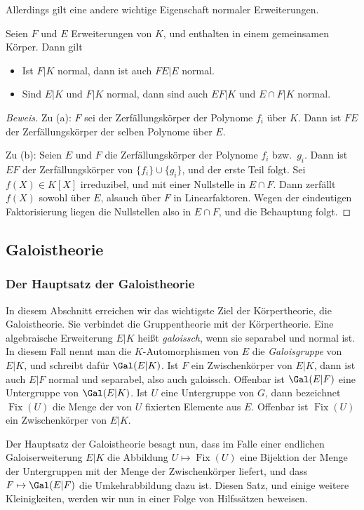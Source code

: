 \documentclass[12pt,a4paper,twoside]{article}
\newcommand{\ei}[1]{\emph{#1}\index{#1}}
\DeclareMathOperator{\Fix}{Fix}
\begin{document}
Allerdings gilt eine andere wichtige Eigenschaft normaler Erweiterungen.
\begin{Satz}
  Seien $F$ und $E$ Erweiterungen von $K$, und enthalten in einem gemeinsamen
  K\"orper. Dann gilt
  \begin{itemize}
  \item[(a)] Ist $F|K$ normal, dann ist auch $FE|E$ normal.
\item[(b)] Sind $E|K$ und $F|K$ normal, dann sind auch $EF|K$ und $E\cap F|K$
  normal.
  \end{itemize}
\end{Satz}
\begin{proof}[Beweis]
  Zu (a): $F$ sei der Zerf\"allungsk\"orper der Polynome $f_i$ \"uber $K$.
  Dann ist $FE$ der Zerf\"allungsk\"orper der selben Polynome \"uber $E$.

Zu (b): Seien $E$ und $F$ die Zerf\"allungsk\"orper der Polynome $f_i$ bzw.\
$g_i$. Dann ist $EF$ der Zerf\"allungsk\"orper von $\{f_i\}\cup\{g_i\}$, und
der erste Teil folgt. Sei $f(X)\in K[X]$ irreduzibel, und mit einer Nullstelle
in $E\cap F$. Dann zerf\"allt $f(X)$ sowohl \"uber $E$, alsauch \"uber $F$ in
Linearfaktoren. Wegen der eindeutigen Faktorisierung liegen die Nullstellen
also in $E\cap F$, und die Behauptung folgt.
\end{proof}
\subsection{Galoistheorie}
\subsubsection{Der Hauptsatz der Galoistheorie}
In diesem Abschnitt erreichen wir das wichtigste Ziel der K\"orpertheorie, die
Galoistheorie. Sie verbindet die Gruppentheorie mit der K\"orpertheorie. Eine
algebraische Erweiterung $E|K$ hei\ss t \ei{galoissch}, wenn sie separabel und
normal ist. In diesem Fall nennt man die $K$-Automorphismen von $E$ die
\ei{Galoisgruppe} von $E|K$, und schreibt daf\"ur $\Gal(E|K)$. Ist $F$ ein
Zwischenk\"orper von $E|K$, dann ist auch $E|F$ normal und separabel, also
auch galoissch. Offenbar ist $\Gal(E|F)$ eine Untergruppe von $\Gal(E|K)$. Ist
$U$ eine Untergruppe von $G$, dann bezeichnet $\Fix(U)$ die Menge der von $U$
fixierten Elemente aus $E$. Offenbar ist $\Fix(U)$ ein Zwischenk\"orper von
$E|K$.

Der Hauptsatz der Galoistheorie besagt nun, dass im Falle einer endlichen
Galoiserweiterung $E|K$ die Abbildung $U\mapsto\Fix(U)$ eine Bijektion der
Menge der Untergruppen mit der Menge der Zwischenk\"orper liefert, und dass
$F\mapsto\Gal(E|F)$ die Umkehrabbildung dazu ist. Diesen Satz, und einige
weitere Kleinigkeiten, werden wir nun in einer Folge von Hilfss\"atzen
beweisen.
\end{document}
